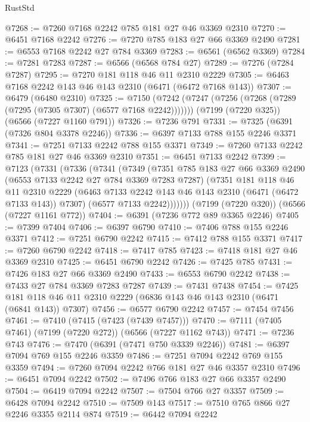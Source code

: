 \begin{lexlean}{RustStd}
\begin{coremodule}
@7268 := @7260 @7168 @2242 @785 @181 @27 @46 @3369 @2310
@7270 := @6451 @7168 @2242
@7276 := @7270 @785 @183 @27 @66 @3369 @2490
@7281 := @6553 @7168 @2242 @27 @784 @3369
@7283 := @6561 (@6562 @3369)
@7284 := @7281 @7283
@7287 := @6566 (@6568 @784 @27)
@7289 := @7276 (@7284 @7287)
@7295 := @7270 @181 @118 @46 @11 @2310 @2229
@7305 := @6463 @7168 @2242 @143 @46 @143 @2310 (@6471 (@6472 @7168 @143))
@7307 := @6479 (@6480 @2310)
@7325 := @7150
    (@7242 (@7247 (@7256 (@7268 (@7289 (@7295 (@7305 @7307) (@6577 @7168 @2242)))))))
    (@7199 (@7220 @325))
    (@6566 (@7227 @1160 @791))
@7326 := @7236 @791
@7331 := @7325 (@6391 (@7326 @804 @3378 @2246))
@7336 := @6397 @7133 @788 @155 @2246 @3371
@7341 := @7251 @7133 @2242 @788 @155 @3371
@7349 := @7260 @7133 @2242 @785 @181 @27 @46 @3369 @2310
@7351 := @6451 @7133 @2242
@7399 := @7123
    (@7331
      (@7336
        (@7341
          (@7349
            (@7351
              @785
              @183
              @27
              @66
              @3369
              @2490
              (@6553 @7133 @2242 @27 @784 @3369 @7283 @7287)
              (@7351
                @181
                @118
                @46
                @11
                @2310
                @2229
                (@6463 @7133 @2242 @143 @46 @143 @2310 (@6471 (@6472 @7133 @143)) @7307)
                (@6577 @7133 @2242)))))))
    (@7199 (@7220 @320))
    (@6566 (@7227 @1161 @772))
@7404 := @6391 (@7236 @772 @89 @3365 @2246)
@7405 := @7399 @7404
@7406 := @6397 @6790
@7410 := @7406 @788 @155 @2246 @3371
@7412 := @7251 @6790 @2242
@7415 := @7412 @788 @155 @3371
@7417 := @7260 @6790 @2242
@7418 := @7417 @785
@7423 := @7418 @181 @27 @46 @3369 @2310
@7425 := @6451 @6790 @2242
@7426 := @7425 @785
@7431 := @7426 @183 @27 @66 @3369 @2490
@7433 := @6553 @6790 @2242
@7438 := @7433 @27 @784 @3369 @7283 @7287
@7439 := @7431 @7438
@7454 := @7425 @181 @118 @46 @11 @2310 @2229 (@6836 @143 @46 @143 @2310 (@6471 (@6841 @143)) @7307)
@7456 := @6577 @6790 @2242
@7457 := @7454 @7456
@7461 := @7410 (@7415 (@7423 (@7439 @7457)))
@7470 := @7111 (@7405 @7461) (@7199 (@7220 @272)) (@6566 (@7227 @1162 @743))
@7471 := @7236 @743
@7476 := @7470 (@6391 (@7471 @750 @3339 @2246))
@7481 := @6397 @7094 @769 @155 @2246 @3359
@7486 := @7251 @7094 @2242 @769 @155 @3359
@7494 := @7260 @7094 @2242 @766 @181 @27 @46 @3357 @2310
@7496 := @6451 @7094 @2242
@7502 := @7496 @766 @183 @27 @66 @3357 @2490
@7504 := @6419 @7094 @2242
@7507 := @7504 @766 @27 @3357
@7509 := @6428 @7094 @2242
@7510 := @7509 @143
@7517 := @7510 @765 @866 @27 @2246 @3355 @2114 @874
@7519 := @6442 @7094 @2242

\end{coremodule}
\end{lexlean}
